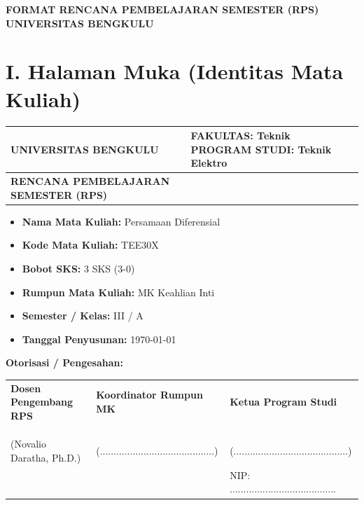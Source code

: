 \documentclass[11pt,a4paper]{article}
\begin{document}
\begin{center}
    {\Large\bfseries\color{unibblue} FORMAT RENCANA PEMBELAJARAN SEMESTER (RPS)}\\
    \vspace{0.2cm}
    {\Large\bfseries UNIVERSITAS BENGKULU}\\
\end{center}
\vspace{0.5cm}

\section*{I. Halaman Muka (Identitas Mata Kuliah)}

\noindent
\begin{tabularx}{\textwidth}{|X|X|}
\hline
\textbf{UNIVERSITAS BENGKULU} & \textbf{FAKULTAS: Teknik} \vspace{0.3cm} \newline \textbf{PROGRAM STUDI: Teknik Elektro} \\ \hline
\textbf{RENCANA PEMBELAJARAN SEMESTER (RPS)} & \\ \hline
\end{tabularx}
\vspace{0.3cm}

\begin{itemize}[leftmargin=*, label=$\bullet$]
    \item \textbf{Nama Mata Kuliah:} Persamaan Diferensial
    \item \textbf{Kode Mata Kuliah:} TEE30X
    \item \textbf{Bobot SKS:} 3 SKS (3-0)
    \item \textbf{Rumpun Mata Kuliah:} MK Keahlian Inti
    \item \textbf{Semester / Kelas:} III / A
    \item \textbf{Tanggal Penyusunan:} \today
\end{itemize}

\vspace{0.3cm}
\noindent\textbf{Otorisasi / Pengesahan:}
\begin{table}[h]
\centering
\begin{tabularx}{0.9\textwidth}{C{0.3\textwidth} C{0.3\textwidth} C{0.3\textwidth}}
\textbf{Dosen Pengembang RPS} & \textbf{Koordinator Rumpun MK} & \textbf{Ketua Program Studi} \\
& & \\
& & \\
& & \\
(Novalio Daratha, Ph.D.) & (..........................................) & (..........................................)\\
& & NIP: .......................................
\end{tabularx}
\end{table}
\vspace{0.5cm}
\end{document}
